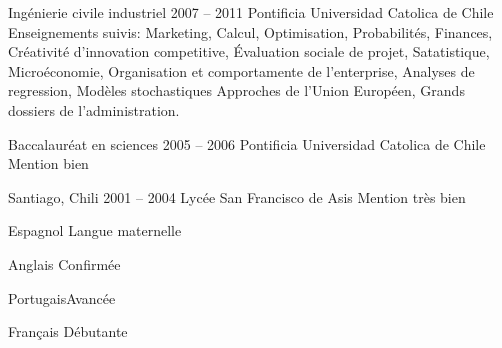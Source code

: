 \documentclass[30pt, french]{tccv}
\begin{document}
\begin{upshape}
%
%


\begin{education}

\vspace{0.5cm}
\item[Ingénierie civile industriel]{2007 -- 2011}
     {Pontificia Universidad Catolica de Chile} 
     {Enseignements suivis: Marketing, Calcul, Optimisation, Probabilités, Finances, Créativité d'innovation competitive, Évaluation sociale de projet, Satatistique, 
     Microéconomie, Organisation et comportamente de l'enterprise, Analyses de regression, Modèles stochastiques
     Appro\-ches de l'Union Européen, Grands dossiers de\- l'ad\-mi\-ni\-stra\-tion.}



\vspace{0.5cm}
\item[Baccalauréat en sciences ]{2005 -- 2006}
     {Pontificia Universidad Catolica de Chile}
     {Mention bien}

 \vspace{0.5cm}    
\item[Santiago, Chili]{2001 -- 2004}
     {Lycée San Francisco de Asis}
     {Mention très bien}


\end{education}


%
%


\begin{competence}

\begin{factlist}
\item{Espagnol} {Langue maternelle}	
\item{Anglais}  {Confirmée}	
\item{Portugais}{Avancée}	
\item{Français} {Débutante}
\end{factlist}


\end{competence}
\end{upshape}
\end{document}
